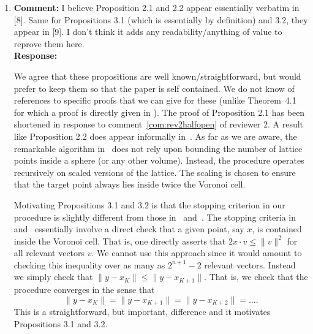 \documentclass[a4paper,10pt]{article}
\begin{document}
\begin{enumerate}

\item\textbf{Comment:} 
I believe Proposition 2.1 and 2.2 appear essentially verbatim in [8]. Same for Propositions
3.1 (which is essentially by definition) and 3.2, they appear in [9]. I don’t think it adds any
readability/anything of value to reprove them here.
\\\textbf{Response:}

We agree that these propositions are well known/straightforward, but would prefer to keep them so that the paper is self contained. We do not know of references to specific proofs that we can give for these (unlike Theorem~4.1 for which a proof is directly given in \cite[Theorem~3]{ConwaySloane1992_voronoi_lattice_3d_obtuse_superbases}).  The proof of Proposition 2.1 has been shortened in response to comment~\ref{com:rev2halfopen} of reviewer 2.  A result like Proposition 2.2 does appear informally in~\cite[Sec~5]{Shalvi_iterativeslicer_2009}.  As far as we are aware, the remarkable algorithm in~\cite{MicciancioVoulgaris_deterministic_jv_2013} does not rely upon bounding the number of lattice points inside a sphere (or any other volume).  Instead, the procedure operates recursively on scaled versions of the lattice.  The scaling is chosen to ensure that the target point always lies inside twice the Voronoi cell. 

Motivating Propositions 3.1 and 3.2 is that the stopping criterion in our procedure is slightly different from those in~\cite{Shalvi_iterativeslicer_2009} and~\cite{MicciancioVoulgaris_deterministic_jv_2013}.  The stopping criteria in~\cite{Shalvi_iterativeslicer_2009} and~\cite{MicciancioVoulgaris_deterministic_jv_2013} essentially involve a direct check that a given point, say $x$, is contained inside the Voronoi cell.  That is, one directly asserts that $2 x \cdot v \leq \|v\|^2$ for all relevant vectors $v$.  We cannot use this approach since it would amount to checking this inequality over as many as $2^{n+1}-2$ relevant vectors.  Instead we simply check that $\|y - x_K\| \leq \|y - x_{K+1}\|$.  That is, we check that the procedure converges in the sense that 
\[
\|y - x_K\| = \|y - x_{K+1}\| = \|y - x_{K+2}\| = \dots.
\]
This is a straightforward, but important, difference and it motivates Propositions 3.1 and 3.2.

\newcommand{\rng}{\operatorname{rng}}
\newcommand{\subrng}{\operatorname{subr}}
\newcommand{\decrng}{\operatorname{decrng}}


\end{enumerate}
\end{document}
